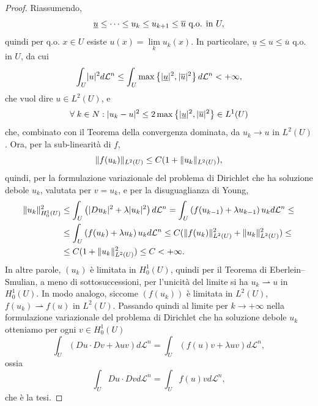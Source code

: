 \begin{proof}
Riassumendo,
\[ \underline{u}\le \dots \le u_k \le u_{k+1} \le \overline{u} \textup{ q.o. in } U,\]
quindi per q.o. $x \in U$ esiste $u(x) = \lim\limits_{k} u_k(x)$. In particolare, $\underline{u} \le u \le \overline{u}$ q.o. in $U$, da cui 
\[ \int_U \lvert u\rvert^2 d\mathcal{L}^n \le \int_U \max\left\lbrace \lvert\underline{u}\rvert^2,\lvert\overline{u}\rvert^2\right\rbrace d\mathcal{L}^n < +\infty, \]
che vuol dire $u \in L^2(U)$, e 
\[ \forall\; k \in N: \lvert u_k-u\rvert^2 \le 2 \max\left\lbrace \lvert\underline{u}\rvert^2,\lvert\overline{u}\rvert^2\right\rbrace \in L^1(U)\]
che, combinato con il Teorema della convergenza dominata, da $u_k \to u$ in $L^2(U)$. Ora, per la sub-linearità di $f$,
\[ \lVert f(u_k)\rVert_{L^2(U)}\le C(1+ \lVert u_k\rVert_{L^2(U)}), \]
quindi, per la formulazione variazionale del problema di Dirichlet che ha soluzione debole $u_k$, valutata per $v=u_k$, e per la disuguaglianza di Young,
\begin{align*}
	\lVert u_k\rVert_{H^1_0(U)}^2 &\le \int_{U} \left( \lvert Du_k\rvert^2 +\lambda \lvert u_k\rvert^2 \right) d\mathcal{L}^n = \int_U \left( f(u_{k-1})+\lambda u_{k-1}\right) u_k d\mathcal{L}^n \le \\
	&\le \int_U \left( f(u_{k})+\lambda u_{k}\right) u_k d\mathcal{L}^n \le C(\lVert f(u_k)\rVert^2_{L^2(U)} + \lVert u_k\rVert_{L^2(U)}^2) \le \\
	&\le C(1 + \lVert u_k\rVert_{L^2(U)}^2) \le C<+\infty.
\end{align*}
In altre parole, $(u_k)$ è limitata in $H^1_0(U)$, quindi per il Teorema di Eberlein--Smulian, a meno di sottosuccessioni, per l'unicità del limite si ha $u_k \rightharpoonup u$ in $H^1_0(U)$. In modo analogo, siccome $(f(u_k))$ è limitata in $L^2(U)$, $f(u_k) \rightharpoonup f(u)$ in $L^2(U)$. Passando quindi al limite per $k \to +\infty$ nella formulazione variazionale del problema di Dirichlet che ha soluzione debole $u_k$ otteniamo per ogni $v \in H^1_0(U)$
\[ \int_{U} \left( Du \cdot Dv +\lambda uv \right) d\mathcal{L}^n = \int_U \left( f(u)v + \lambda uv\right)  d\mathcal{L}^n, \]
ossia
\[ \int_{U} Du \cdot Dv  d\mathcal{L}^n = \int_Uf(u)v d\mathcal{L}^n, \]
che è la tesi.
\end{proof}

